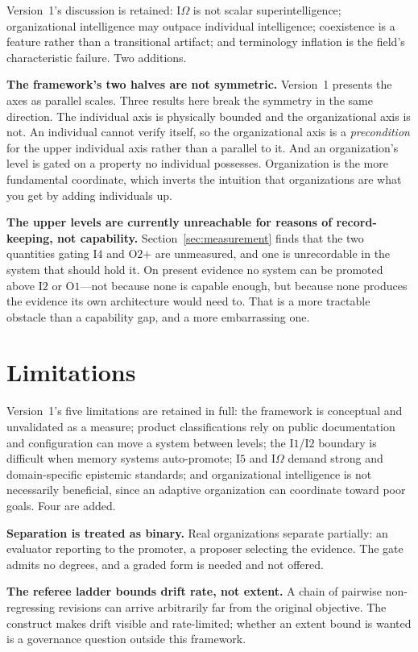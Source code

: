 \documentclass[11pt]{article}
\newcommand{\Ilev}[1]{\ensuremath{\mathrm{I}#1}}
\newcommand{\Olev}[1]{\ensuremath{\mathrm{O}#1}}
\newcommand{\IOm}{\ensuremath{\mathrm{I}\Omega}}
\begin{document}
Version~1's discussion is retained: \IOm{} is not scalar superintelligence; organizational intelligence may outpace individual intelligence; coexistence is a feature rather than a transitional artifact; and terminology inflation is the field's characteristic failure. Two additions.

\textbf{The framework's two halves are not symmetric.} Version~1 presents the axes as parallel scales. Three results here break the symmetry in the same direction. The individual axis is physically bounded and the organizational axis is not. An individual cannot verify itself, so the organizational axis is a \emph{precondition} for the upper individual axis rather than a parallel to it. And an organization's level is gated on a property no individual possesses. Organization is the more fundamental coordinate, which inverts the intuition that organizations are what you get by adding individuals up.

\textbf{The upper levels are currently unreachable for reasons of record-keeping, not capability.} Section~\ref{sec:measurement} finds that the two quantities gating \Ilev{4} and \Olev{2}$+$ are unmeasured, and one is unrecordable in the system that should hold it. On present evidence no system can be promoted above \Ilev{2} or \Olev{1}---not because none is capable enough, but because none produces the evidence its own architecture would need to. That is a more tractable obstacle than a capability gap, and a more embarrassing one.

\section{Limitations}

Version~1's five limitations are retained in full: the framework is conceptual and unvalidated as a measure; product classifications rely on public documentation and configuration can move a system between levels; the \Ilev{1}/\Ilev{2} boundary is difficult when memory systems auto-promote; \Ilev{5} and \IOm{} demand strong and domain-specific epistemic standards; and organizational intelligence is not necessarily beneficial, since an adaptive organization can coordinate toward poor goals. Four are added.

\textbf{Separation is treated as binary.} Real organizations separate partially: an evaluator reporting to the promoter, a proposer selecting the evidence. The gate admits no degrees, and a graded form is needed and not offered.

\textbf{The referee ladder bounds drift rate, not extent.} A chain of pairwise non-regressing revisions can arrive arbitrarily far from the original objective. The construct makes drift visible and rate-limited; whether an extent bound is wanted is a governance question outside this framework.
\end{document}
